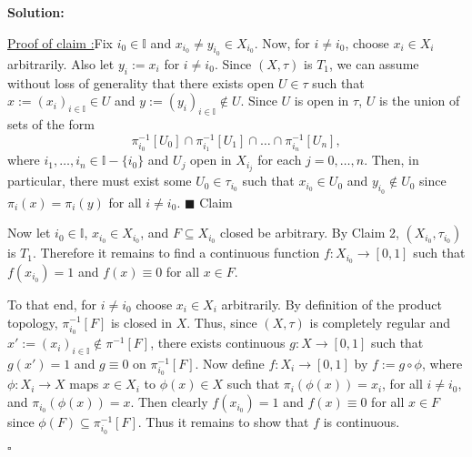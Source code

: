 \documentclass[12pt]{article}
\newcounter{ProofCounter}
\newcounter{ClaimCounter}[ProofCounter]
\newenvironment{Solution}{\stepcounter{ProofCounter}\textbf{Solution:}}{\hfill$\square$}
\newenvironment{claim}[1]{\vspace{1mm}\stepcounter{ClaimCounter}\par\noindent\underline{\bf Claim \theClaimCounter:}\space#1}{}
\newenvironment{claimproof}[1]{\par\noindent\underline{Proof of claim \theClaimCounter:}\space#1}{\hfill $\blacksquare$ Claim \theClaimCounter}
\begin{document}
\begin{Solution}
\begin{enumerate}
      \begin{claimproof}
        Fix $i_0 \in \mathbb{I}$ and $x_{i_0} \neq y_{i_0} \in X_{i_0}$. Now, for $i \neq i_0$, choose $x_i \in X_i$ arbitrarily. Also let $y_i :=
        x_i$ for $i \neq i_0$. Since $(X, \tau)$ is
        $T_1$, we can assume without loss of generality that there exists open $U \in \tau$ such that $x := (x_i)_{i\in\mathbb{I}} \in U$ and 
        $y := \left( y_i \right)_{i\in\mathbb{I}} \notin U$. Since $U$ is open in $\tau$, $U$ is the union of sets of the form
        \[
          \pi_{i_0}^{-1}[U_0]\cap\pi_{i_1}^{-1}[U_1] \cap \dots \cap \pi_{i_n}^{-1}[U_n],
        \]
        where $i_1, \dots, i_n \in \mathbb{I}-\{i_0\}$ and $U_j$ open in $X_{i_j}$ for each $j = 0, \dots, n$. Then, in particular, there must exist
        some $U_0 \in \tau_{i_0}$ such that $x_{i_0} \in U_0$ and $y_{i_0} \notin U_0$ since $\pi_i(x) = \pi_i(y)$ for all $i \neq i_0$.
      \end{claimproof}

      Now let $i_0 \in \mathbb{I}$, $x_{i_0} \in X_{i_0}$, and $F \subseteq X_{i_0}$ closed be arbitrary. By Claim 2, $(X_{i_0}, \tau_{i_0})$ is
      $T_1$. Therefore it remains to find a continuous function $f : X_{i_0} \rightarrow [0,1]$ such that $f(x_{i_0}) = 1$ and $f(x) \equiv 0$ for all
      $x \in F$.

      To that end, for $i \neq i_0$ choose $x_i \in X_i$ arbitrarily. By definition of the product topology, $\pi_{i_0}^{-1}[F]$ is closed in $X$. Thus, since $(X,
      \tau)$ is completely regular and $x' := (x_i)_{i\in\mathbb{I}} \notin \pi^{-1}[F]$, there exists continuous $g : X \rightarrow [0,1]$ such that
      $g(x') = 1$ and $g \equiv 0$ on $\pi_{i_0}^{-1}[F]$. Now define $f : X_i \rightarrow [0,1]$ by $f := g \circ \phi$, where $\phi : X_i \rightarrow X$
      maps $x \in X_i$ to $\phi(x) \in X$ such that $\pi_i(\phi(x)) = x_i$, for all $i \neq i_0$, and $\pi_{i_0}(\phi(x)) = x$. Then clearly
      $f(x_{i_0}) = 1$ and $f(x) \equiv 0$ for all $x \in F$ since $\phi(F) \subseteq \pi_{i_0}^{-1}[F]$. Thus it remains to show that $f$ is continuous.


\end{enumerate}
\end{Solution}
\end{document}
